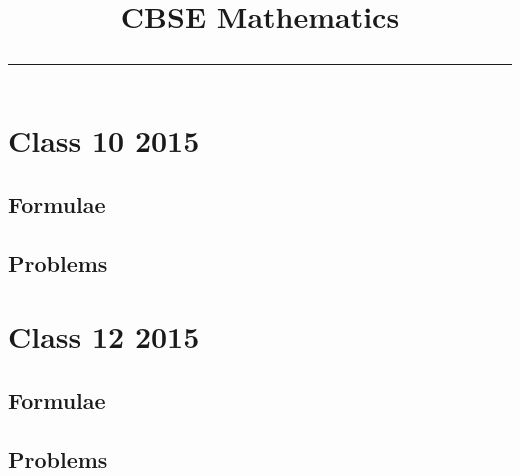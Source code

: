 \documentclass[journal]{IEEEtran}
\numberwithin{equation}{enumi}
\numberwithin{figure}{enumi}
\numberwithin{table}{enumi}
\begin{document}

\onecolumn
\title{\begin{center}{\Huge CBSE Mathematics\par}\vspace{12mm}{\LARGE Class 10 and Class 12\par}\vspace{6mm}{\Large 2015\par}\vspace{6mm}\rule{0.4\columnwidth}{0.4pt}\end{center}}
\author{}
\date{}
\maketitle
\clearpage
\tableofcontents
\clearpage

\section{Class 10 2015}
\clearpage
\subsection{Formulae}

\clearpage
\subsection{Problems}

\clearpage

\section{Class 12 2015}
\clearpage
\subsection{Formulae}

\clearpage
\subsection{Problems}

\end{document}
